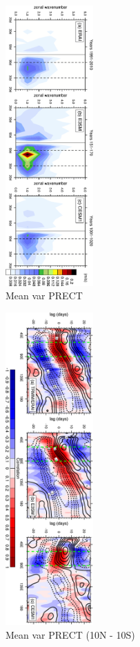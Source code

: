 \documentclass[draft,ms]{AGUTeX}
\begin{document}
\begin{article}
\begin{figure}[t]
  \begin{center}
    \noindent\includegraphics[width=0.3\textwidth,angle=90.]{./figs/f_mjo_spectra_U850_djf.pdf}
  \end{center}
  \caption{Mean var PRECT } 
\label{f_mjo_spectra_U850_djf}
\end{figure}

\begin{figure}[t]
  \begin{center}
    \noindent\includegraphics[width=0.3\textwidth,angle=90.]{./figs/f_lagcorr_djf.pdf}
  \end{center}
  \caption{Mean var PRECT (10N - 10S) } 
\label{f_lagcorr_djf}
\end{figure}


\end{article}
\end{document}
